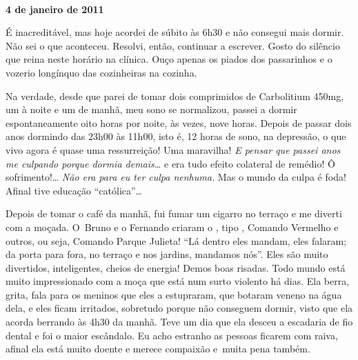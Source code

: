 \begin{center}\asterisc{}​\end{center}


\begin{flushright}\textbf{4 de janeiro de 2011}\end{flushright}


É inacreditável, mas hoje acordei de súbito às 6h30 e não consegui mais
dormir. Não sei o que aconteceu. Resolvi, então, continuar a escrever.
Gosto do silêncio que reina neste horário na clínica. Ouço apenas os
piados dos passarinhos e o vozerio longínquo das cozinheiras na cozinha.

Na verdade, desde que parei de tomar dois comprimidos de Carbolitium 
450mg, um à noite e um de manhã, meu sono se normalizou, passei a dormir
espontaneamente oito horas por noite, às vezes, nove horas. Depois de
passar dois anos dormindo das 23h00 às 11h00, isto é, 12 horas de sono,
na depressão, o que vivo agora é quase uma ressurreição! Uma maravilha!
\emph{E pensar que passei anos me culpando porque dormia demais…}
e era tudo efeito colateral de remédio! Ô sofrimento!… \emph{Não
era para eu ter culpa nenhuma.} Mas o mundo da culpa é foda! Afinal tive
educação ``católica''…

Depois de tomar o café da manhã, fui fumar um cigarro no terraço e me
diverti com a moçada. O~Bruno e o Fernando criaram o , tipo ,
Comando Vermelho e outros, ou seja, Comando Parque Julieta! ``Lá dentro
eles mandam, eles falaram; da porta para fora, no terraço e nos jardins,
mandamos nós''. Eles são muito divertidos, inteligentes, cheios de
energia! Demos boas risadas. Todo mundo está muito impressionado com a
moça que está num surto violento há dias. Ela berra, grita, fala para os
meninos que eles a estupraram, que botaram veneno na água dela, e eles
ficam irritados, sobretudo porque não conseguem dormir, visto que ela
acorda berrando às 4h30 da manhã. Teve um dia que ela desceu a escadaria
de fio dental e foi o maior escândalo. Eu acho estranho as pessoas
ficarem com raiva, afinal ela está muito doente e merece compaixão e~muita pena também.

